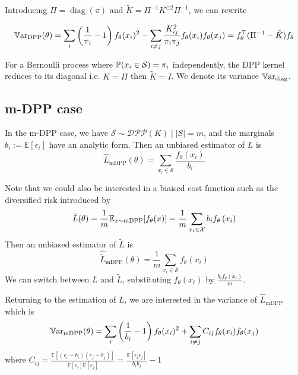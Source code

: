 Introducing $\Pi = \operatorname{diag}(\pi)$ and $\tilde K = \Pi^{-1}K^{\odot 2} \Pi^{-1}$, we can rewrite  

\begin{equation}
	\operatorname{\mathbb V ar}_{\textrm{DPP}}(\theta)=\sum_{i}\left(\frac{1}{\pi_{i}}-1\right) f_\theta(x_{i})^{2}-\sum_{i \neq j} \frac{K_{ij}^{2}}{\pi_{i} \pi_{j}} f_\theta(x_{i}) f_\theta(x_{j}) =  f_\theta^\top (\Pi^{-1}  - \tilde{K}) f_\theta 
\end{equation}

For a Bernoulli process where $\mathbb{P}(x_i \in \mathcal S) = \pi_i$ independently, the DPP kernel reduces to its diagonal i.e. $K = \Pi$ then $\tilde K = I$. We denote its variance $\operatorname{\mathbb V ar}_{\textrm{diag}}$.


\subsection{m-DPP case}

In the m-DPP case, we have $\mathcal S \sim \mathcal{DPP}(K) \mid |S|=m$, and the marginals $b_{i} := \mathbb{E}\left[\epsilon_{i}\right]$ have an analytic form. Then an unbiased estimator of $L$ is
\begin{equation*}
	\hat L_{\textrm{mDPP}}(\theta) = \sum_{x_i\in \mathcal S} \frac{f_\theta(x_i)}{b_i}
\end{equation*}

Note that we could also be interested in a biaised cost function such as the diversified risk introduced by \cite{zhang2017dppminibatch}
$$
\tilde L(\theta) =\frac{1}{m}\mathbb{E}_{x \sim \textrm{mDPP}}[f_\theta(x)]=\frac{1}{m}\sum_{x_i \in \mathcal X} b_{i} f_\theta\left(x_{i}\right)
$$
Then an unbiased estimator of $\tilde L$ is
\begin{equation*}
	\hat{\tilde L}_{\textrm{mDPP}}(\theta) = \frac{1}{m}\sum_{x_i\in \mathcal S} f_\theta(x_i)
\end{equation*}
We can switch between $L$ and $\tilde L$, substituting $f_\theta(x_i)$ by $\frac{b_i f_\theta(x_i)}{m}$.

Returning to the estimation of $L$, we are interested in the variance of $\hat L_{\textrm{mDPP}}$ which is
\begin{equation}
	\operatorname{\mathbb V ar}_{\textrm{mDPP}}(\theta)=\sum_{i}\left(\frac{1}{b_i}-1\right) f_\theta(x_i)^2
	+ \sum_{i \neq j} C_{ij}f_\theta(x_i) f_\theta(x_j)
\end{equation}
where $C_{ij}=\frac{\mathbb{E}\left[\left(\epsilon_{i}-b_{i}\right)\left(\epsilon_{j}-b_{j}\right)\right]}{\mathbb{E}\left[\epsilon_{i}\right] \mathbb{E}\left[\epsilon_{j}\right]}=\frac{\mathbb{E}\left[\epsilon_{i} \epsilon_{j}\right]}{b_{i} b_{j}}-1
$

